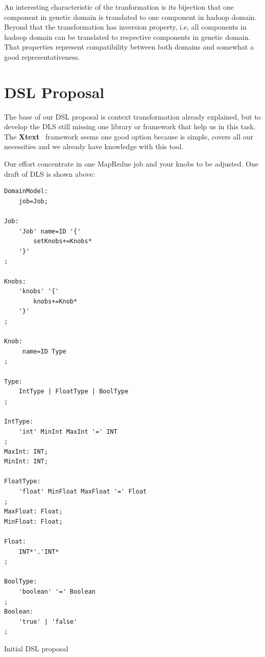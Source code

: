 An interesting characteristic of the tranformation is its bijection that one
component in genetic domain is translated to one component in hadoop domain. Beyond
that the transformation has inversion property, i.e, all components in hadoop domain
can be translated to respective components in genetic domain. That properties
represent compatibility between both domains and somewhat a good representativeness.

\section{DSL Proposal}

The base of our DSL proposal is context transformation already explained, but to
develop the DLS still missing one library or framework that help us in this task.
The \textbf{Xtext}~\cite{xtext} framework seems one good option because is simple,
covers all our necessities and we already have knowledge with this tool.

Our effort concentrate in one MapRedue job and your knobs to be adjusted. One
draft of DLS is shown above:

\singlespacing
\begin{listing}[H]
\begin{verbatim}
DomainModel:
	job=Job;
	
Job:
	'Job' name=ID '{'
		setKnobs+=Knobs*
	'}'
;
	
Knobs:
	'knobs' '{'
		knobs+=Knob*
	'}' 
;

Knob:
	 name=ID Type
;

Type:
	IntType | FloatType | BoolType
;

IntType:
	'int' MinInt MaxInt '=' INT
;
MaxInt: INT;
MinInt: INT;

FloatType:
	'float' MinFloat MaxFloat '=' Float
;
MaxFloat: Float;
MinFloat: Float;

Float:
	INT*'.'INT*
;

BoolType:
	'boolean' '=' Boolean
;
Boolean:
	'true' | 'false' 
;

\end{verbatim}
\caption{Initial DSL proposal} 
\label{listing:dlsProposal}
\end{listing}

